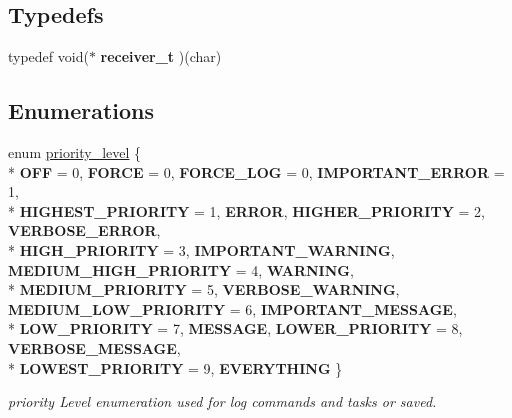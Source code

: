 \subsection*{Typedefs}
\begin{DoxyCompactItemize}
\item 
\hypertarget{group__subsys_ga37636e04877dd6421933267897117036}{typedef void($\ast$ {\bfseries receiver\+\_\+t} )(char)}\label{group__subsys_ga37636e04877dd6421933267897117036}

\end{DoxyCompactItemize}
\subsection*{Enumerations}
\begin{DoxyCompactItemize}
\item 
enum \hyperlink{group__subsys_ga1d309594956a828563f9181d766daa08}{priority\+\_\+level} \{ \\*
{\bfseries O\+F\+F} = 0, 
{\bfseries F\+O\+R\+C\+E} = 0, 
{\bfseries F\+O\+R\+C\+E\+\_\+\+L\+O\+G} = 0, 
{\bfseries I\+M\+P\+O\+R\+T\+A\+N\+T\+\_\+\+E\+R\+R\+O\+R} = 1, 
\\*
{\bfseries H\+I\+G\+H\+E\+S\+T\+\_\+\+P\+R\+I\+O\+R\+I\+T\+Y} = 1, 
{\bfseries E\+R\+R\+O\+R}, 
{\bfseries H\+I\+G\+H\+E\+R\+\_\+\+P\+R\+I\+O\+R\+I\+T\+Y} = 2, 
{\bfseries V\+E\+R\+B\+O\+S\+E\+\_\+\+E\+R\+R\+O\+R}, 
\\*
{\bfseries H\+I\+G\+H\+\_\+\+P\+R\+I\+O\+R\+I\+T\+Y} = 3, 
{\bfseries I\+M\+P\+O\+R\+T\+A\+N\+T\+\_\+\+W\+A\+R\+N\+I\+N\+G}, 
{\bfseries M\+E\+D\+I\+U\+M\+\_\+\+H\+I\+G\+H\+\_\+\+P\+R\+I\+O\+R\+I\+T\+Y} = 4, 
{\bfseries W\+A\+R\+N\+I\+N\+G}, 
\\*
{\bfseries M\+E\+D\+I\+U\+M\+\_\+\+P\+R\+I\+O\+R\+I\+T\+Y} = 5, 
{\bfseries V\+E\+R\+B\+O\+S\+E\+\_\+\+W\+A\+R\+N\+I\+N\+G}, 
{\bfseries M\+E\+D\+I\+U\+M\+\_\+\+L\+O\+W\+\_\+\+P\+R\+I\+O\+R\+I\+T\+Y} = 6, 
{\bfseries I\+M\+P\+O\+R\+T\+A\+N\+T\+\_\+\+M\+E\+S\+S\+A\+G\+E}, 
\\*
{\bfseries L\+O\+W\+\_\+\+P\+R\+I\+O\+R\+I\+T\+Y} = 7, 
{\bfseries M\+E\+S\+S\+A\+G\+E}, 
{\bfseries L\+O\+W\+E\+R\+\_\+\+P\+R\+I\+O\+R\+I\+T\+Y} = 8, 
{\bfseries V\+E\+R\+B\+O\+S\+E\+\_\+\+M\+E\+S\+S\+A\+G\+E}, 
\\*
{\bfseries L\+O\+W\+E\+S\+T\+\_\+\+P\+R\+I\+O\+R\+I\+T\+Y} = 9, 
{\bfseries E\+V\+E\+R\+Y\+T\+H\+I\+N\+G}
 \}
\begin{DoxyCompactList}\small\item\em priority Level enumeration used for log commands and tasks or saved. \end{DoxyCompactList}\item 

\end{DoxyCompactItemize}
